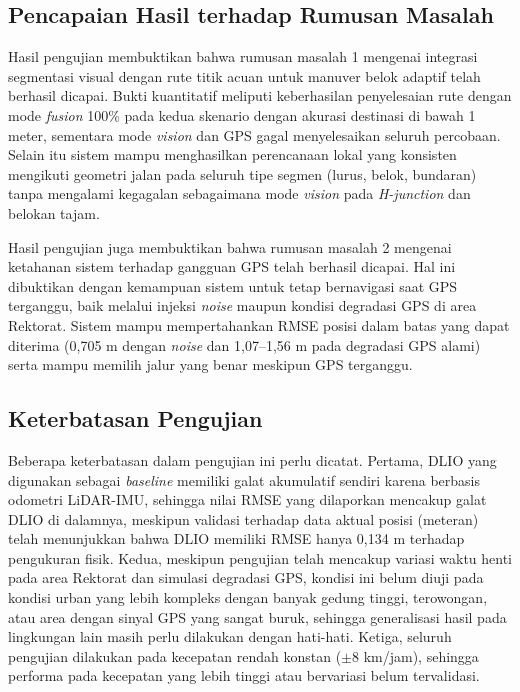 \subsection{Pencapaian Hasil terhadap Rumusan Masalah}
\label{sec:pencapaian_rm}

Hasil pengujian membuktikan bahwa rumusan masalah 1 mengenai integrasi segmentasi visual dengan rute titik acuan untuk manuver belok adaptif telah berhasil dicapai.
Bukti kuantitatif meliputi keberhasilan penyelesaian rute dengan mode \emph{fusion} 100\% pada kedua skenario dengan akurasi destinasi di bawah 1 meter, sementara mode \emph{vision} dan GPS gagal menyelesaikan seluruh percobaan.
Selain itu sistem mampu menghasilkan perencanaan lokal yang konsisten mengikuti geometri jalan pada seluruh tipe segmen (lurus, belok, bundaran) tanpa mengalami kegagalan sebagaimana mode \emph{vision} pada \emph{H-junction} dan belokan tajam.

Hasil pengujian juga membuktikan bahwa rumusan masalah 2 mengenai ketahanan sistem terhadap gangguan GPS telah berhasil dicapai.
Hal ini dibuktikan dengan kemampuan sistem untuk tetap bernavigasi saat GPS terganggu, baik melalui injeksi \emph{noise} maupun kondisi degradasi GPS di area Rektorat.
Sistem mampu mempertahankan RMSE posisi dalam batas yang dapat diterima (0,705 m dengan \emph{noise} dan 1,07--1,56 m pada degradasi GPS alami) serta mampu memilih jalur yang benar meskipun GPS terganggu.

\subsection{Keterbatasan Pengujian}
\label{sec:keterbatasan}

Beberapa keterbatasan dalam pengujian ini perlu dicatat. Pertama, DLIO yang digunakan sebagai \emph{baseline} memiliki galat akumulatif sendiri karena berbasis odometri LiDAR-IMU, sehingga nilai RMSE yang dilaporkan mencakup galat DLIO di dalamnya, meskipun validasi terhadap data aktual posisi (meteran) telah menunjukkan bahwa DLIO memiliki RMSE hanya 0,134 m terhadap pengukuran fisik.
Kedua, meskipun pengujian telah mencakup variasi waktu henti pada area Rektorat dan simulasi degradasi GPS, kondisi ini belum diuji pada kondisi urban yang lebih kompleks dengan banyak gedung tinggi, terowongan, atau area dengan sinyal GPS yang sangat buruk, sehingga generalisasi hasil pada lingkungan lain masih perlu dilakukan dengan hati-hati.
Ketiga, seluruh pengujian dilakukan pada kecepatan rendah konstan ($\pm$8 km/jam), sehingga performa pada kecepatan yang lebih tinggi atau bervariasi belum tervalidasi.
